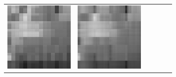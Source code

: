 \documentclass[11pt,a4paper,openright,oneside]{book}
\numberwithin{equation}{section}
\begin{document}
{\begin{figure}[h]
\begin{adjustwidth}{-3cm}{-3cm}
\begin{tabular}{>{\centering\arraybackslash}m{1.5cm} m{2.5cm} m{2.5cm} m{2.5cm} m{2.5cm} m{2.5cm}}
        \includegraphics[width=\linewidth]{media/tnale/AAAfruits-comp3-ale-0.5.png} & 
        \includegraphics[width=\linewidth]{media/tnale/AAAfruits-comp4-ale-0.5.png} &

\end{tabular}
\end{adjustwidth}
\end{figure}}
\end{document}
